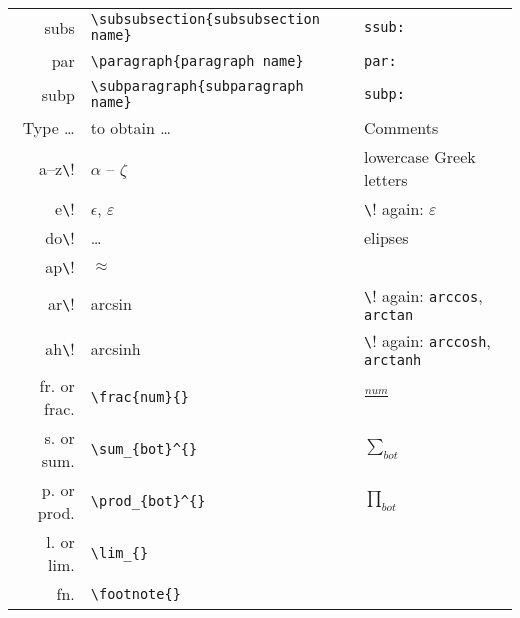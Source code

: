 \documentclass[10pt]{article}
\begin{document}
\begin{table}
\begin{tabular}{r|l|l}
	subs\tabkey       & \verb!\subsubsection{subsubsection name}!  & \texttt{ssub:}          \\
	par\tabkey        & \verb!\paragraph{paragraph name}!          & \texttt{par:}           \\
	subp\tabkey       & \verb!\subparagraph{subparagraph name}!    & \texttt{subp:}          \\
	\hline
	Type \dots                & to obtain \dots                  & Comments                                                 \\
	\hline
	a--z\cmdkey\verb!\!       & $\alpha$ -- $\zeta$              & lowercase Greek letters                                  \\
	e\cmdkey\verb!\!          & $\epsilon$, $\varepsilon$        & \cmdkey\verb!\! again: $\varepsilon$                     \\
	do\cmdkey\verb!\!         & \dots                            & elipses                                                  \\
	ap\cmdkey\verb!\!         & $\approx$                        &                                                          \\
	ar\cmdkey\verb!\!         & arcsin                           & \cmdkey\verb!\! again: \texttt{arccos}, \texttt{arctan}  \\
	ah\cmdkey\verb!\!         & arcsinh                          & \cmdkey\verb!\! again: \texttt{arccosh}, \texttt{arctanh}\\
	\hline
	fr\ctlkey\shiftkey. or frac\ctlkey\shiftkey.    & \verb!\frac{num}{}!              & $\frac{num}{}$      \\
	s\ctlkey\shiftkey. or sum\ctlkey\shiftkey.      & \verb!\sum_{bot}^{}!             & $\sum_{bot}^{}$     \\ 
	p\ctlkey\shiftkey. or prod\ctlkey\shiftkey.     & \verb!\prod_{bot}^{}!            & $\prod_{bot}^{}$    \\ 
	l\ctlkey\shiftkey. or lim\ctlkey\shiftkey.      & \verb!\lim_{}!                   &                     \\
	fn\ctlkey\shiftkey.                             & \verb!\footnote{}!               &                     \\ 

\end{tabular}
\end{table}
\end{document}
